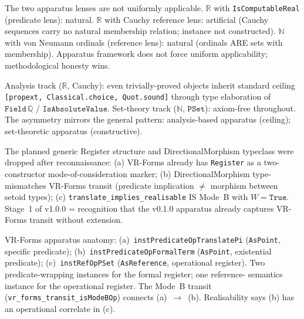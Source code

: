 \begin{finding}
\label{finding:S5A}
\leanok
{}
The two apparatus lenses are not uniformly applicable.  $\mathbb{R}$ with
\texttt{IsComputableReal} (predicate lens): natural.  $\mathbb{R}$ with
Cauchy reference lens: artificial (Cauchy sequences carry no natural
membership relation; instance not constructed).  $\mathbb{N}$ with
von Neumann ordinals (reference lens): natural (ordinals ARE sets with
membership).  Apparatus framework does not force uniform applicability;
methodological honesty wins.
\end{finding}

\begin{finding}
\label{finding:S5B}
\leanok
{}
Analysis track ($\mathbb{R}$, Cauchy): even trivially-proved objects inherit
standard ceiling \texttt{[propext, Classical.choice, Quot.sound]} through
type elaboration of $\texttt{Field}\,\mathbb{Q}$ / $\texttt{IsAbsoluteValue}$.
Set-theory track ($\mathbb{N}$, $\texttt{PSet}$): axiom-free throughout.
The asymmetry mirrors the general pattern: analysis-based apparatus (ceiling);
set-theoretic apparatus (constructive).
\end{finding}

\begin{finding}
\label{finding:S1A}
\leanok
{}
The planned generic Register structure and DirectionalMorphism typeclass
were dropped after reconnaissance: (a) VR-Forms already has \texttt{Register}
as a two-constructor mode-of-consideration marker; (b) DirectionalMorphism
type-mismatches VR-Forms transit (predicate implication $\ne$ morphism between
setoid types); (c) \texttt{translate\_implies\_realisable} IS Mode~B with
$W = \texttt{True}$.  Stage~1 of v1.0.0 = recognition that the v0.1.0
apparatus already captures VR-Forms transit without extension.
\end{finding}

\begin{finding}
\label{finding:S1B}
\leanok
{}
VR-Forms apparatus anatomy:
(a)~\texttt{instPredicateOpTranslatePi} (\texttt{AsPoint}, specific predicate);
(b)~\texttt{instPredicateOpFormalTerm} (\texttt{AsPoint}, existential predicate);
(c)~\texttt{instRefOpPSet} (\texttt{AsReference}, operational register).
Two predicate-wrapping instances for the formal register; one reference-
semantics instance for the operational register.  The Mode~B transit
(\texttt{vr\_forms\_transit\_isModeBOp}) connects (a)~$\to$~(b).
Realisability says (b) has an operational correlate in (c).
\end{finding}

